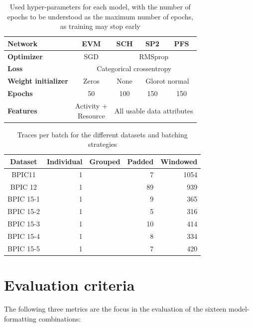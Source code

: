 \begin{table}[ht!]
    \centering
    \begin{tabular}{lcccc}
        \textbf{Network}   & \textbf{EVM} & \textbf{SCH} & \textbf{SP2} & \textbf{PFS}\\
        \hline
        \textbf{Optimizer} & SGD & \multicolumn{3}{c}{RMSprop} \\
        \textbf{Loss}      &\multicolumn{4}{c}{Categorical crossentropy}\\
        \textbf{Weight initializer} & Zeros & None & \multicolumn{2}{c}{Glorot normal}\\
        \textbf{Epochs}    & 50 & 100 & 150 & 150\\
        \textbf{Features}  & \makecell{Activity +\\Resource} & \multicolumn{3}{c}{All usable data attributes}\\
    \end{tabular}
    \caption[Used hyper-parameters for each model]{Used hyper-parameters for each model, with the number of epochs to be understood as the maximum number of epochs, as training may stop early}
    \label{tab:training-setup}
\end{table}


\begin{table}
\centering
\begin{tabular}{c|rrrr}
Dataset & Individual & Grouped & Padded & Windowed \\
\hline
BPIC11    & 1 & & 7 & 1054\\
BPIC 12   & 1 & & 89 & 939\\
BPIC 15-1 & 1 & & 9 & 365\\
BPIC 15-2 & 1 & & 5 & 316\\
BPIC 15-3 & 1 & & 10 & 414\\
BPIC 15-4 & 1 & & 8 & 334\\
BPIC 15-5 & 1 & & 7 & 420\\
\end{tabular}
\caption[Batch sizes for each dataset and strategy]{Traces per batch for the different datasets and batching strategies}
\label{tab:batch-sizes}
\end{table}

\section{Evaluation criteria}
\label{sec:eval:criteria}
The following three metrics are the focus in the evaluation of the sixteen model-formatting combinations:

